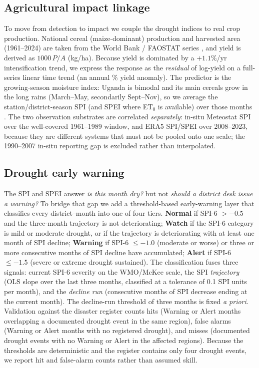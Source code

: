 \documentclass[preprint,12pt]{elsarticle}
\begin{document}
\subsection{Agricultural impact linkage}\label{sec:agri}
To move from detection to impact we couple the drought indices to real crop
production. National cereal (maize-dominant) production and harvested area
(1961--2024) are taken from the World Bank / FAOSTAT series \cite{worldbank2024},
and yield is derived as $1000\,P/A$ (kg/ha). Because yield is dominated by a
$+1.1\%$/yr intensification trend, we express the response as the \emph{residual}
of log-yield on a full-series linear time trend (an annual \% yield anomaly).
The predictor is the growing-season moisture index: Uganda is bimodal and its
main cereals grow in the long rains (March--May, secondarily Sept--Nov), so we
average the station/district-season SPI (and SPEI where ET$_0$ is available)
over those months \cite{palmer2023}. The two observation substrates are correlated
\emph{separately}: in-situ Meteostat SPI over the well-covered 1961--1989
window, and ERA5 SPI/SPEI over 2008--2023, because they are different systems
that must not be pooled onto one scale; the 1990--2007 in-situ reporting gap is
excluded rather than interpolated.

\subsection{Drought early warning}\label{sec:dew}
The SPI and SPEI answer \emph{is this month dry?} but not \emph{should a district
desk issue a warning?} To bridge that gap we add a threshold-based early-warning
layer that classifies every district--month into one of four tiers. \textbf{Normal}
if SPI-6 $> -0.5$ and the three-month trajectory is not deteriorating;
\textbf{Watch} if the SPI-6 category is mild or moderate drought, or if the
trajectory is deteriorating with at least one month of SPI decline;
\textbf{Warning} if SPI-6 $\leq -1.0$ (moderate or worse) or three or more
consecutive months of SPI decline have accumulated; \textbf{Alert} if SPI-6
$\leq -1.5$ (severe or extreme drought sustained). The classification fuses
three signals: current SPI-6 severity on the WMO/McKee scale, the SPI
\emph{trajectory} (OLS slope over the last three months, classified at a
tolerance of 0.1 SPI units per month), and the \emph{decline run} (consecutive
months of SPI decrease ending at the current month). The decline-run threshold
of three months is fixed \emph{a priori}. Validation against the disaster
register counts hits (Warning or Alert months overlapping a documented drought
event in the same region), false alarms (Warning or Alert months with no
registered drought), and misses (documented drought events with no Warning or
Alert in the affected regions). Because the thresholds are deterministic and the
register contains only four drought events, we report hit and false-alarm counts
rather than assumed skill.
\end{document}
